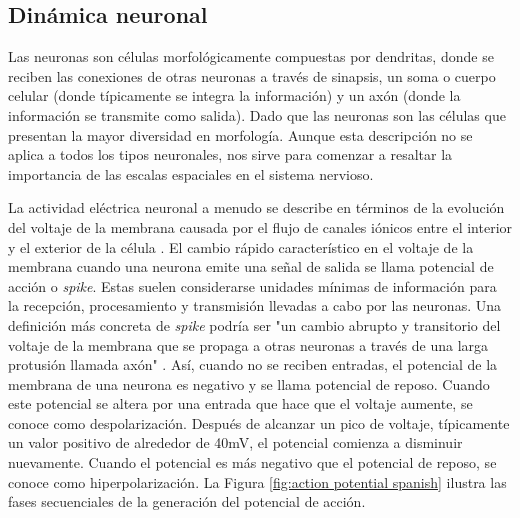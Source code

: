 \subsection{Dinámica neuronal}
Las neuronas son células morfológicamente compuestas por dendritas, donde se reciben las conexiones de otras neuronas a través de sinapsis, un soma o cuerpo celular (donde típicamente se integra la información) y un axón (donde la información se transmite como salida). Dado que las neuronas son las células que presentan la mayor diversidad en morfología. Aunque esta descripción no se aplica a todos los tipos neuronales, nos sirve para comenzar a resaltar la importancia de las escalas espaciales en el sistema nervioso.

La actividad eléctrica neuronal a menudo se describe en términos de la evolución del voltaje de la membrana causada por el flujo de canales iónicos entre el interior y el exterior de la célula \parencite{kandel_principles_2012}. El cambio rápido característico en el voltaje de la membrana cuando una neurona emite una señal de salida se llama potencial de acción o \textit{spike}. Estas suelen considerarse unidades mínimas de información para la recepción, procesamiento y transmisión llevadas a cabo por las neuronas. Una definición más concreta de \textit{spike} podría ser "un cambio abrupto y transitorio del voltaje de la membrana que se propaga a otras neuronas a través de una larga protusión llamada axón" \parencite{izhikevich_dynamical_2007}. Así, cuando no se reciben entradas, el potencial de la membrana de una neurona es negativo y se llama potencial de reposo. Cuando este potencial se altera por una entrada que hace que el voltaje aumente, se conoce como despolarización. Después de alcanzar un pico de voltaje, típicamente un valor positivo de alrededor de 40mV, el potencial comienza a disminuir nuevamente. Cuando el potencial es más negativo que el potencial de reposo, se conoce como hiperpolarización. La Figura \ref{fig:action potential spanish} ilustra las fases secuenciales de la generación del potencial de acción.

